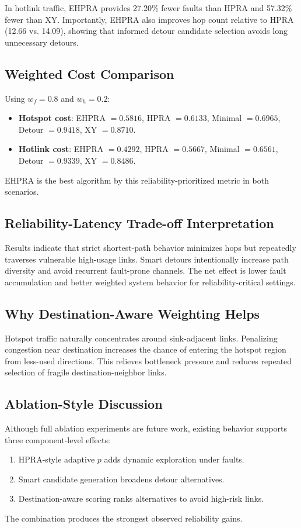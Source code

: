 \documentclass[10pt,a4paper]{article}
\begin{document}
In hotlink traffic, EHPRA provides 27.20\% fewer faults than HPRA and 57.32\% fewer than XY. Importantly, EHPRA also improves hop count relative to HPRA (12.66 vs. 14.09), showing that informed detour candidate selection avoids long unnecessary detours.

\subsection{Weighted Cost Comparison}
Using $w_f=0.8$ and $w_h=0.2$:
\begin{itemize}[leftmargin=6mm]
    \item \textbf{Hotspot cost}: EHPRA $=0.5816$, HPRA $=0.6133$, Minimal $=0.6965$, Detour $=0.9418$, XY $=0.8710$.
    \item \textbf{Hotlink cost}: EHPRA $=0.4292$, HPRA $=0.5667$, Minimal $=0.6561$, Detour $=0.9339$, XY $=0.8486$.
\end{itemize}
EHPRA is the best algorithm by this reliability-prioritized metric in both scenarios.

\subsection{Reliability-Latency Trade-off Interpretation}
Results indicate that strict shortest-path behavior minimizes hops but repeatedly traverses vulnerable high-usage links. Smart detours intentionally increase path diversity and avoid recurrent fault-prone channels. The net effect is lower fault accumulation and better weighted system behavior for reliability-critical settings.

\subsection{Why Destination-Aware Weighting Helps}
Hotspot traffic naturally concentrates around sink-adjacent links. Penalizing congestion near destination increases the chance of entering the hotspot region from less-used directions. This relieves bottleneck pressure and reduces repeated selection of fragile destination-neighbor links.

\subsection{Ablation-Style Discussion}
Although full ablation experiments are future work, existing behavior supports three component-level effects:
\begin{enumerate}[leftmargin=6mm]
    \item HPRA-style adaptive $p$ adds dynamic exploration under faults.
    \item Smart candidate generation broadens detour alternatives.
    \item Destination-aware scoring ranks alternatives to avoid high-risk links.
\end{enumerate}
The combination produces the strongest observed reliability gains.
\end{document}
